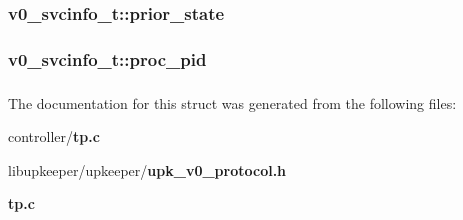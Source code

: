 \subsubsection[{prior\_\-state}]{ {\bf v0\_\-svcinfo\_\-t::prior\_\-state}}\label{structv0__svcinfo__t_aefa11803cfd46f501e2b8bec66b145f6}
\subsubsection[{proc\_\-pid}]{ {\bf v0\_\-svcinfo\_\-t::proc\_\-pid}}\label{structv0__svcinfo__t_a0ad827b2b64c718f86e74281395d7d0c}
\subsubsection[{UPK\_\-V0\_\-SVCINFO\_\-T\_\-FIELDS}]{}\label{structv0__svcinfo__t_a9dcbd16f49c76e2ec3bb8a89784060d1}


The documentation for this struct was generated from the following files:\begin{DoxyCompactItemize}
\item 
controller/{\bf tp.c}\item 
libupkeeper/upkeeper/{\bf upk\_\-v0\_\-protocol.h}\item 
{\bf tp.c}\end{DoxyCompactItemize}
